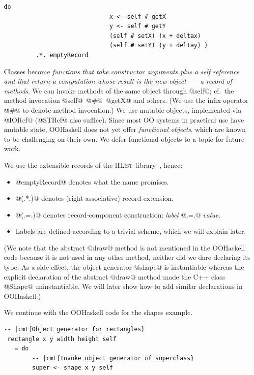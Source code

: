 \documentclass{jfp}
\newcommand{\noskip}{\topsep0pt \parskip0pt \partopsep0pt}
\newcommand{\w}[1]{\textit{#1}}
\newcommand{\HList}{\textsc{HList}}
\begin{document}
\begin{Verbatim}[fontsize=\small,commandchars=\|\{\}]
                            do
                              x <- self # getX
                              y <- self # getY
                              (self # setX) (x + deltax)
                              (self # setY) (y + deltay) )
         .*. emptyRecord
\end{Verbatim}


Classes become \emph{functions that take constructor arguments plus a
self reference and that return a computation whose result is the new
object~---~a record of methods}. We can invoke methods of the same
object through @self@; cf.\ the method invocation @self@~@#@~@getX@
and others. (We use the infix operator @#@ to denote method
invocation.) We use mutable objects, implemented via @IORef@
(@STRef@ also suffice). Since most OO systems in practical use
have mutable state, OOHaskell does not yet offer
\emph{functional objects}, which are known to be challenging on their
own. We defer functional objects to a topic for future work. 

We use the extensible records of the \HList\ library~\cite{HLIST-HW04},
hence:
%
\begin{itemize}\noskip
\item @emptyRecord@ denotes what the name promises.
\item @(.*.)@ denotes (right-associative) record extension.
\item @(.=.)@ denotes record-component construction: \w{label} @.=.@ \w{value}.
\item Labels are defined according to a trivial scheme, which we will explain later.
\end{itemize}
%
(We note that the abstract @draw@ method is not mentioned in the
OOHaskell code because it is not used in any other method, neither did
we dare declaring its type. As a side effect, the object generator
@shape@ is instantiable whereas the explicit declaration of the
abstract @draw@ method made the C++ class @Shape@ uninstantiable. We
will later show how to add similar declarations in OOHaskell.)

\medskip

\noindent
We continue with the OOHaskell code for the shapes example.

\begin{Verbatim}[fontsize=\small,commandchars=\|\{\}]
 -- |cmt{Object generator for rectangles}
 rectangle x y width height self
   = do
        -- |cmt{Invoke object generator of superclass}
        super <- shape x y self
\end{Verbatim}
\end{document}
